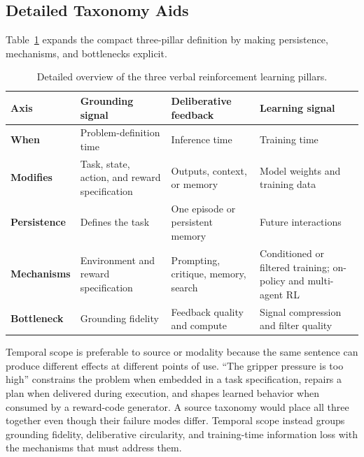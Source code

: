 \subsection{Detailed Taxonomy Aids}
\label{supp:subsec:taxonomy-aids}

Table~\ref{supp:tab:pillar-overview} expands the compact three-pillar definition by making persistence, mechanisms, and bottlenecks explicit.

\begin{table}[t]
    \centering
    \small
    \renewcommand{\arraystretch}{1.15}
    \caption{Detailed overview of the three verbal reinforcement learning pillars.}
    \label{supp:tab:pillar-overview}
    \begin{tabular}{@{} p{} p{} p{} p{} @{}}
        \toprule
        \textbf{Axis} & \textbf{Grounding signal} & \textbf{Deliberative feedback} & \textbf{Learning signal} \\
        \midrule
        \textbf{When} & Problem-definition time & Inference time & Training time \\
        \textbf{Modifies} & Task, state, action, and reward specification & Outputs, context, or memory & Model weights and training data \\
        \textbf{Persistence} & Defines the task & One episode or persistent memory & Future interactions \\
        \textbf{Mechanisms} & Environment and reward specification & Prompting, critique, memory, search & Conditioned or filtered training; on-policy and multi-agent RL \\
        \textbf{Bottleneck} & Grounding fidelity & Feedback quality and compute & Signal compression and filter quality \\
        \bottomrule
    \end{tabular}
\end{table}

Temporal scope is preferable to source or modality because the same sentence can produce different effects at different points of use. ``The gripper pressure is too high'' constrains the problem when embedded in a task specification, repairs a plan when delivered during execution, and shapes learned behavior when consumed by a reward-code generator. A source taxonomy would place all three together even though their failure modes differ. Temporal scope instead groups grounding fidelity, deliberative circularity, and training-time information loss with the mechanisms that must address them.

